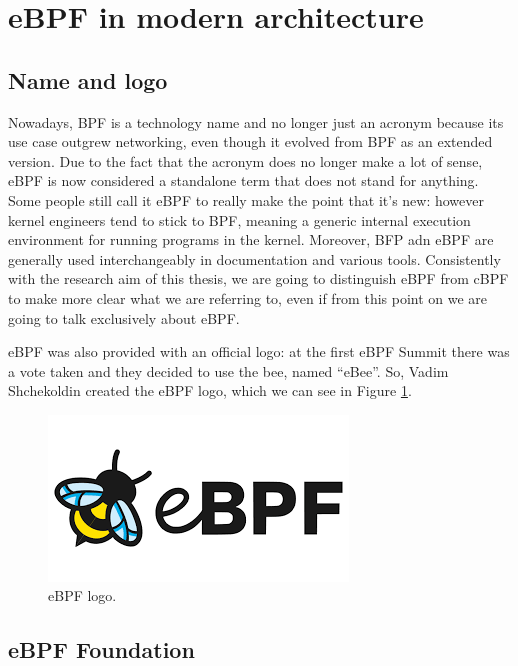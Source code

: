\section{eBPF in modern architecture}

\subsection{Name and logo}

Nowadays, BPF is a technology name and no longer just an acronym because its use case outgrew networking, even though it evolved from BPF as an extended version.
Due to the fact that the acronym does no longer make a lot of sense, eBPF is now considered a standalone term that does not stand for anything.
Some people still call it eBPF to really make the point that it's new: however kernel engineers tend to stick to BPF, meaning a generic internal execution environment for running programs in the kernel.
Moreover, BFP adn eBPF are generally used interchangeably in documentation and various tools.
Consistently with the research aim of this thesis, we are going to distinguish eBPF from cBPF to make more clear what we are referring to, even if from this point on we are going to talk exclusively about eBPF.

eBPF was also provided with an official logo: at the first eBPF Summit there was a vote taken and they decided to use the bee, named ``eBee''.
So, Vadim Shchekoldin created the eBPF logo, which we can see in Figure \ref{fig:eBPF_logo}.

\begin{figure}[h]
	\centering
	\includegraphics[width=0.7\linewidth]{images/History/eBPF_logo.png}
	\caption{eBPF logo.}
	\label{fig:eBPF_logo}
\end{figure}

\subsection{eBPF Foundation}

